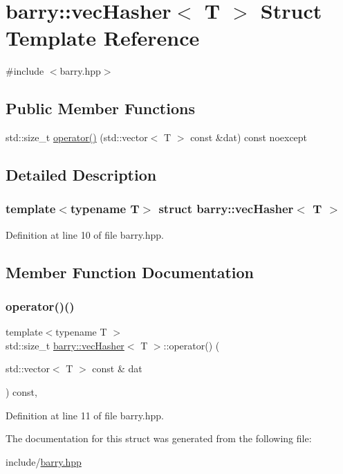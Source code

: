 \hypertarget{structbarry_1_1vec_hasher}{}\section{barry\+:\+:vec\+Hasher$<$ T $>$ Struct Template Reference}
\label{structbarry_1_1vec_hasher}


{\ttfamily \#include $<$barry.\+hpp$>$}

\subsection*{Public Member Functions}
\begin{DoxyCompactItemize}
\item 
std\+::size\+\_\+t \hyperlink{structbarry_1_1vec_hasher_ada8dea483f4fc12f469e161b2fd09225}{operator()} (std\+::vector$<$ T $>$ const \&dat) const noexcept
\end{DoxyCompactItemize}


\subsection{Detailed Description}
\subsubsection*{template$<$typename T$>$\newline
struct barry\+::vec\+Hasher$<$ T $>$}



Definition at line 10 of file barry.\+hpp.



\subsection{Member Function Documentation}
\mbox{\label{structbarry_1_1vec_hasher_ada8dea483f4fc12f469e161b2fd09225}} 
\subsubsection{\texorpdfstring{operator()()}{operator()()}}
{\footnotesize\ttfamily template$<$typename T $>$ \\
std\+::size\+\_\+t \hyperlink{structbarry_1_1vec_hasher}{barry\+::vec\+Hasher}$<$ T $>$\+::operator() (\begin{DoxyParamCaption}\item[{std\+::vector$<$ T $>$ const \&}]{dat }\end{DoxyParamCaption}) const\hspace{0.3cm}{\ttfamily [inline]}, {\ttfamily [noexcept]}}



Definition at line 11 of file barry.\+hpp.



The documentation for this struct was generated from the following file\+:\begin{DoxyCompactItemize}
\item 
include/\hyperlink{barry_8hpp}{barry.\+hpp}\end{DoxyCompactItemize}
